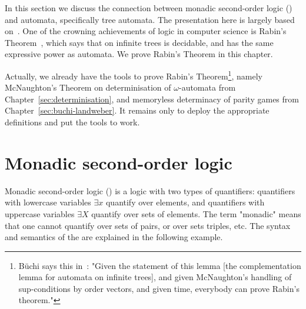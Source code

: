 \label{sec:mso}

In this section we discuss the connection between  monadic second-order logic (\mso) and automata, specifically tree automata. The presentation here is largely based on~\cite{Thomas:1997ec}. One of the crowning achievements of logic in computer science  is Rabin's Theorem~\cite{Rabin:1969kx}, which says that \mso on infinite trees is decidable, and has the same expressive power as automata. We prove Rabin's Theorem in this chapter.

Actually, we already have the  tools to prove Rabin's Theorem\footnote{Büchi says this in~\cite[page 2]{Buchi:1983in}: 
"Given the statement of this lemma [the complementation lemma for automata on infinite trees], and given McNaughton's handling of sup-conditions by order vectors, and given time, everybody can prove Rabin's theorem."}, namely McNaughton's Theorem on determinisation of $\omega$-automata from Chapter~\ref{sec:determinisation}, and memoryless determinacy of parity games from Chapter~\ref{sec:buchi-landweber}. It remains only to deploy the appropriate definitions and put the tools to work. 



\section{Monadic second-order logic}
Monadic second-order logic (\mso) is a logic with two types of quantifiers: quantifiers with lowercase variables $\exists x$  quantify over elements, and quantifiers with uppercase variables $\exists X$ quantify over sets of elements. The term "monadic" means that one cannot quantify over sets of pairs, or over sets triples, etc. The syntax and semantics of the \mso are explained in the following example.

